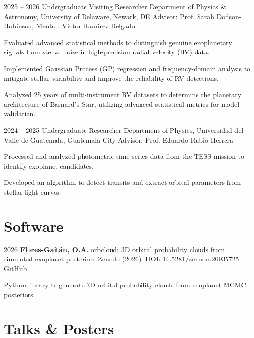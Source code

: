 \documentclass[11pt, a4paper]{article}
\begin{document}
\rubenzahlEntry
    {2025 – 2026}
    {Undergraduate Visiting Researcher}
    {Department of Physics \& Astronomy, University of Delaware, Newark, DE}
    {Advisor: Prof. Sarah Dodson-Robinson; Mentor: Victor Ramirez Delgado}
    {
        \item Evaluated advanced statistical methods to distinguish genuine exoplanetary signals from stellar noise in high-precision radial velocity (RV) data.
        \item Implemented Gaussian Process (GP) regression and frequency-domain analysis to mitigate stellar variability and improve the reliability of RV detections.
        \item Analyzed 25 years of multi-instrument RV datasets to determine the planetary architecture of Barnard's Star, utilizing advanced statistical metrics for model validation.
    }

\rubenzahlEntry
    {2024 – 2025}
    {Undergraduate Researcher}
    {Department of Physics, Universidad del Valle de Guatemala, Guatemala City}
    {Advisor: Prof. Eduardo Rubio-Herrera}
    {
        \item Processed and analyzed photometric time-series data from the TESS mission to identify exoplanet candidates.
        \item Developed an algorithm to detect transits and extract orbital parameters from stellar light curves.
    }

\section{Software}

\rubenzahlSoftware
    {2026}
    {\textbf{Flores-Gaitán, O.A.}}
    {orbcloud: 3D orbital probability clouds from simulated exoplanet posteriors}
    {Zenodo (2026). \href{https://doi.org/10.5281/zenodo.20935725}{DOI: 10.5281/zenodo.20935725} \kern 0.2cm \href{https://github.com/oscarfloresgaitan/orbcloud}{GitHub}}

\begin{highlights}
    \item Python library to generate 3D orbital probability clouds from exoplanet MCMC posteriors.
\end{highlights}

\section{Talks \& Posters}
\end{document}
